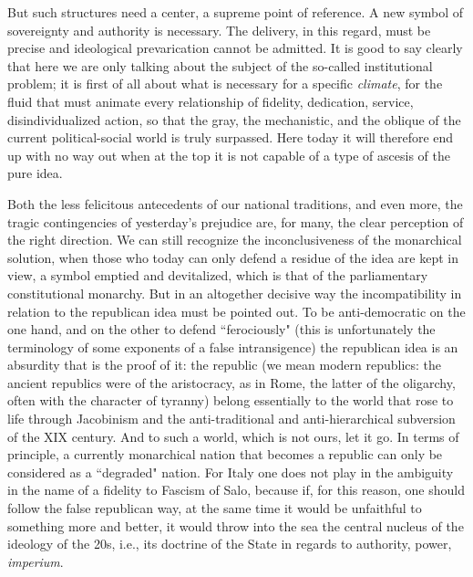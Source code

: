 But such structures need a center, a supreme point of reference. A new symbol of sovereignty and authority is necessary. The delivery, in this regard, must be precise and ideological prevarication cannot be admitted. It is good to say clearly that here we are only talking about the subject of the so-called institutional problem; it is first of all about what is necessary for a specific \emph{climate}, for the fluid that must animate every relationship of fidelity, dedication, service, disindividualized action, so that the gray, the mechanistic, and the oblique of the current political-social world is truly surpassed. Here today it will therefore end up with no way out when at the top it is not capable of a type of ascesis of the pure idea.

Both the less felicitous antecedents of our national traditions, and even more, the tragic contingencies of yesterday's prejudice are, for many, the clear perception of the right direction. We can still recognize the inconclusiveness of the monarchical solution, when those who today can only defend a residue of the idea are kept in view, a symbol emptied and devitalized, which is that of the parliamentary constitutional monarchy. But in an altogether decisive way the incompatibility in relation to the republican idea must be pointed out. To be anti-democratic on the one hand, and on the other to defend ``ferociously" (this is unfortunately the terminology of some exponents of a false intransigence) the republican idea is an absurdity that is the proof of it: the republic (we mean modern republics: the ancient republics were of the aristocracy, as in Rome, the latter of the oligarchy, often with the character of tyranny) belong essentially to the world that rose to life through Jacobinism and the anti-traditional and anti-hierarchical subversion of the XIX century. And to such a world, which is not ours, let it go. In terms of principle, a currently monarchical nation that becomes a republic can only be considered as a ``degraded" nation. For Italy one does not play in the ambiguity in the name of a fidelity to Fascism of Salo, because if, for this reason, one should follow the false republican way, at the same time it would be unfaithful to something more and better, it would throw into the sea the central nucleus of the ideology of the 20s, i.e., its doctrine of the State in regards to authority, power, \emph{imperium}.

